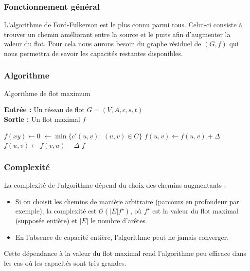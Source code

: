 \documentclass[a4paper]{article}
\begin{document}
\subsubsection{Fonctionnement général}
L'algorithme de Ford-Fulkerson est le plus connu parmi tous. Celui-ci consiste à trouver un chemin améliorant entre la source et le puits afin d'augmenter la valeur du flot. Pour cela nous aurons besoin du graphe résiduel de $(G, f)$ qui nous permettra de savoir les capacités restantes disponibles.

\subsubsection{Algorithme}
\begin{algorithm}[H]
\caption{Algorithme de flot maximum}
\textbf{Entrée :} Un réseau de flot $G = (V, A, c, s, t)$ \\
\textbf{Sortie :} Un flot maximal $f$
\begin{algorithmic}[1]
    \State $f(xy) \gets 0$
\EndFor
{}
    \State \Delta $\gets \min \{c'(u, v):\: (u, v)\in C\}$ 
			\State $f(u, v) \gets f(u, v) + \Delta$
		\Else
			\State $f(u, v) \gets f(v, u) - \Delta$
		\EndIf
	\EndFor
\EndWhile
\State \Return $f$
\end{algorithmic}
\end{algorithm}
\subsubsection{Complexité}
La complexité de l’algorithme dépend du choix des chemins augmentants :
\begin{itemize}
    \item Si on choisit les chemins de manière arbitraire (parcours en profondeur par exemple), la complexité est $\mathcal{O}(|E|f^\star)$, où $f^\star$ est la valeur du flot maximal (supposée entière) et $|E|$ le nombre d’arêtes.
    \item En l’absence de capacité entière, l’algorithme peut ne jamais converger.
\end{itemize}
Cette dépendance à la valeur du flot maximal rend l’algorithme peu efficace dans les cas où les capacités sont très grandes.
\end{document}
